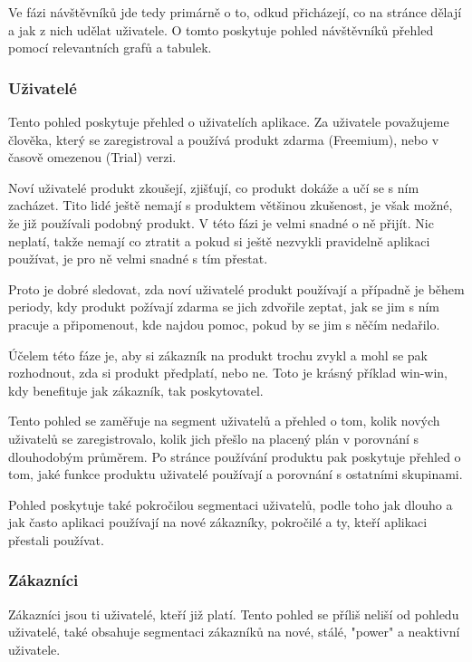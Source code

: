 \documentclass[bc,male,java,dept456]{diploma}						%
\begin{document}
\bigskip

Ve fázi návštěvníků jde tedy primárně o to, odkud přicházejí, co na stránce dělají a jak z nich udělat uživatele. O tomto poskytuje pohled návštěvníků přehled pomocí relevantních grafů a tabulek.




\subsubsection{Uživatelé}

Tento pohled poskytuje přehled o uživatelích aplikace. Za uživatele považujeme člověka, který se zaregistroval a používá produkt zdarma (Freemium), nebo v časově omezenou (Trial) verzi.

Noví uživatelé produkt zkoušejí, zjišťují, co produkt dokáže a učí se s ním zacházet. Tito lidé ještě nemají s  produktem většinou zkušenost, je však možné, že již používali podobný produkt. V této fázi je velmi snadné o ně přijít. Nic neplatí, takže nemají co ztratit a pokud si ještě nezvykli pravidelně aplikaci používat, je pro ně velmi snadné s tím přestat. 

Proto je dobré sledovat, zda noví uživatelé produkt používají a případně je během periody, kdy produkt požívají zdarma se jich zdvořile zeptat, jak se jim s ním pracuje a připomenout, kde najdou pomoc, pokud by se jim s něčím nedařilo.

Účelem této fáze je, aby si zákazník na produkt trochu zvykl a mohl se pak rozhodnout, zda si produkt předplatí, nebo ne. Toto je krásný příklad win-win, kdy benefituje jak zákazník, tak poskytovatel.

Tento pohled se zaměřuje na segment uživatelů a přehled o tom, kolik nových u\-ži\-va\-te\-lů se zaregistrovalo, kolik jich přešlo na placený plán v porovnání s dlouhodobým průměrem. Po stránce používání produktu pak poskytuje přehled o tom, jaké funkce produktu u\-ži\-va\-te\-lé používají a porovnání s ostatními skupinami.

Pohled poskytuje také pokročilou segmentaci uživatelů, podle toho jak dlouho a jak často aplikaci používají na nové zákazníky, pokročilé a ty, kteří aplikaci přestali používat.


\subsubsection{Zákazníci}

Zákazníci jsou ti uživatelé, kteří již platí. Tento pohled se příliš neliší od pohledu uživatelé, také obsahuje segmentaci zákazníků na nové, stálé, "power" a neaktivní uživatele.
\end{document}
